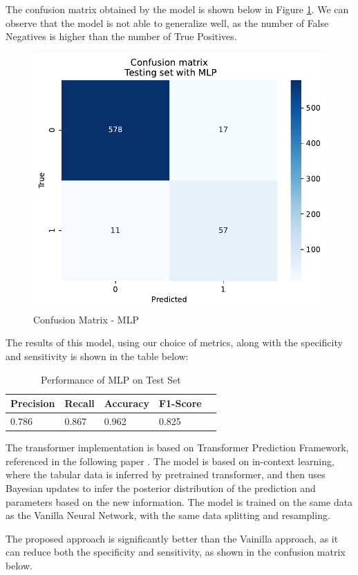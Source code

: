 \documentclass[10pt,letterpaper]{article}
\begin{document}
The confusion matrix obtained by the model is shown below in Figure \ref{fig:cm-nn}. 
We can observe that the model is not able to generalize well, as the number of False Negatives is
higher than the number of True Positives.

\begin{figure}[H]
    \centering
    \includegraphics[width=0.5\linewidth]{plots/nn_confusion_matrix.pdf}
    \caption{Confusion Matrix - MLP}
    \label{fig:cm-nn}
\end{figure}

The results of this model, using our choice of metrics, along with the specificity and sensitivity is shown in the table below:

\begin{table}[H]
\centering
\footnotesize
\begin{tabular}{lllll}
\toprule
\textbf{Precision} & \textbf{Recall} & \textbf{Accuracy} &  \textbf{F1-Score}\\
\midrule
0.786 & 0.867 & 0.962 & 0.825  \\
\bottomrule
\end{tabular}
\caption{Performance of MLP on Test Set}%
\end{table}

The transformer implementation is based on Transformer Prediction Framework, referenced in the following paper \cite{hollmann2022tabpfn}. 
The model is based on in-context learning, where the tabular data is inferred by pretrained transformer, 
and then uses Bayesian updates to infer the posterior distribution of the prediction and parameters based on the 
new information. The model is trained on the same data as the Vanilla Neural Network, with the same data splitting and resampling.

The proposed approach is significantly better than the Vainilla approach, as it can reduce both 
the specificity and sensitivity, as shown in the confusion matrix below.
\end{document}
